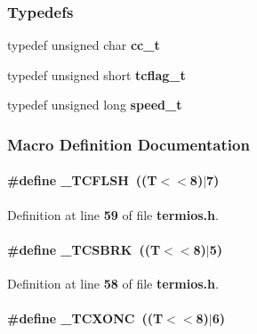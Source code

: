 \subsubsection*{Typedefs}
\begin{DoxyCompactItemize}
\item 
typedef unsigned char {\bf cc\+\_\+t}
\item 
typedef unsigned short {\bf tcflag\+\_\+t}
\item 
typedef unsigned long {\bf speed\+\_\+t}
\end{DoxyCompactItemize}


\subsubsection{Macro Definition Documentation}
\paragraph[{\+\_\+\+T\+C\+F\+L\+SH}]{\setlength{\rightskip}{0pt plus 5cm}\#define \+\_\+\+T\+C\+F\+L\+SH~((\textquotesingle{}T\textquotesingle{}$<$$<$8)$\vert$7)}\label{termios_8h_a0cb6b0c985e910ee382e09d268351e0a}


Definition at line {\bf 59} of file {\bf termios.\+h}.

\paragraph[{\+\_\+\+T\+C\+S\+B\+RK}]{\setlength{\rightskip}{0pt plus 5cm}\#define \+\_\+\+T\+C\+S\+B\+RK~((\textquotesingle{}T\textquotesingle{}$<$$<$8)$\vert$5)}\label{termios_8h_ac149205a8e6fa26e083c389edcea913d}


Definition at line {\bf 58} of file {\bf termios.\+h}.

\paragraph[{\+\_\+\+T\+C\+X\+O\+NC}]{\setlength{\rightskip}{0pt plus 5cm}\#define \+\_\+\+T\+C\+X\+O\+NC~((\textquotesingle{}T\textquotesingle{}$<$$<$8)$\vert$6)}\label{termios_8h_af1962e664060bf836ac33c0e58f11b52}



